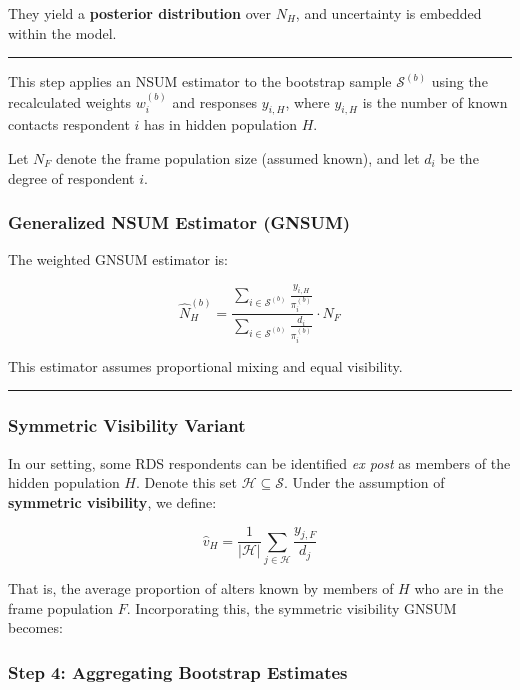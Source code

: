 \documentclass[
  12pt,
  letterpaper,
  DIV=11,
  numbers=noendperiod]{scrartcl}
\theoremstyle{plain}
\theoremstyle{definition}
\begin{document}
They yield a \textbf{posterior distribution} over \(N_H\), and
uncertainty is embedded within the model.

\begin{center}\rule{0.5\linewidth}{0.5pt}\end{center}

This step applies an NSUM estimator to the bootstrap sample
\(\mathcal{S}^{(b)}\) using the recalculated weights \(w_i^{(b)}\) and
responses \(y_{i,H}\), where \(y_{i,H}\) is the number of known contacts
respondent \(i\) has in hidden population \(H\).

Let \(N_F\) denote the frame population size (assumed known), and let
\(d_i\) be the degree of respondent \(i\).

\subsubsection{Generalized NSUM Estimator
(GNSUM)}\label{generalized-nsum-estimator-gnsum}

The weighted GNSUM estimator is:

\[
\hat{N}_H^{(b)} = \frac{\sum_{i \in \mathcal{S}^{(b)}} \frac{y_{i,H}}{\pi_i^{(b)}}}{\sum_{i \in \mathcal{S}^{(b)}} \frac{d_i}{\pi_i^{(b)}}} \cdot N_F
\]

This estimator assumes proportional mixing and equal visibility.

\begin{center}\rule{0.5\linewidth}{0.5pt}\end{center}

\subsubsection{Symmetric Visibility
Variant}\label{symmetric-visibility-variant}

In our setting, some RDS respondents can be identified \emph{ex post} as
members of the hidden population \(H\). Denote this set
\(\mathcal{H} \subseteq \mathcal{S}\). Under the assumption of
\textbf{symmetric visibility}, we define:

\[
\hat{v}_{H} = \frac{1}{|\mathcal{H}|} \sum_{j \in \mathcal{H}} \frac{y_{j,F}}{d_j}
\]

That is, the average proportion of alters known by members of \(H\) who
are in the frame population \(F\). Incorporating this, the symmetric
visibility GNSUM becomes:

\subsubsection{Step 4: Aggregating Bootstrap
Estimates}\label{step-4-aggregating-bootstrap-estimates}
\end{document}

